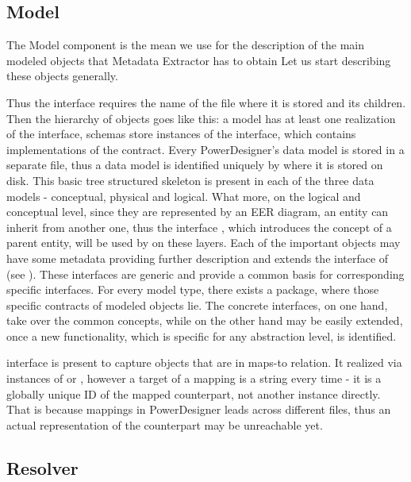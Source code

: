 \subsection{Model}

The Model component is the mean we use for the description of the main modeled objects that Metadata Extractor has to obtain
Let us start describing these objects generally.

Thus the  interface requires the name of the file where it is stored and its children.
Then the hierarchy of objects goes like this: a model has at least one realization of the  interface, schemas store instances of the  interface, which contains implementations of the  contract.
Every PowerDesigner's data model is stored in a separate file, thus a data model is identified uniquely by where it is stored on disk.
This basic tree structured skeleton is present in each of the three data models - conceptual, physical and logical. 
What more, on the logical and conceptual level, since they are represented by an EER diagram, an entity can inherit from another one, thus the interface , which introduces the concept of a parent entity, will be used by on these layers. 
Each of the important objects may have some metadata providing further description and extends the interface of  (see ).
These interfaces are generic and provide a common basis for corresponding specific interfaces.
For every model type, there exists a package, where those specific contracts of modeled objects lie. 
The concrete interfaces, on one hand, take over the common concepts, while on the other hand may be easily extended, once a new functionality, which is specific for any abstraction level, is identified.

 interface is present to capture objects that are in maps-to relation. It realized via instances of  or , however a target of a mapping is a string every time - it is a globally unique ID of the mapped counterpart, not another instance directly. That is because mappings in PowerDesigner leads across different files, thus an actual representation of the counterpart may be unreachable yet.

\subsection{Resolver}

